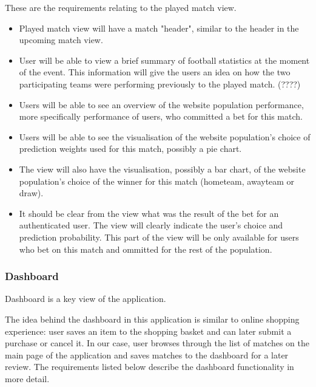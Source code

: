 These are the requirements relating to the played match view.

\begin{itemize}
	\item Played match view will have a match "header", similar to the header in the upcoming match view.
	\item User will be able to view a brief summary of football statistics  at the moment of the event. This information will give the users an idea on how the two participating teams were performing previously to the played match. (????)
	\item Users will be able to see an overview of the website population performance, more specifically performance of users, who committed a bet for this match.
	\item Users will be able to see the visualisation of the website population's choice of prediction weights used for this match, possibly a pie chart.
	\item The view will also have the visualisation, possibly a bar chart, of the website population's choice of the winner for this match (hometeam, awayteam or draw). 
	\item It should be clear from the view what was the result of the bet for an authenticated user. The view will clearly indicate the user's choice and prediction probability. This part of the view will be only available for users who bet on this match and ommitted for the rest of the population. 
\end{itemize}

\subsubsection{Dashboard}
\label{subsubsec:dashboard_req}
Dashboard is a key view of the application.

The idea behind the dashboard in this application is similar to online shopping experience: user saves an item to the shopping basket and can later submit a purchase or cancel it. In our case, user browses through the list of matches on the main page of the application and saves matches to the dashboard for a later review. The requirements listed below describe the dashboard functionality in more detail.

